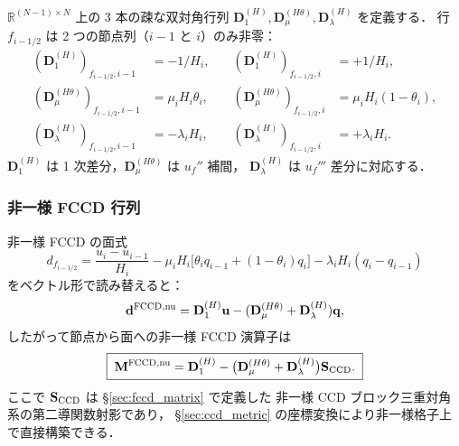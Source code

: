 $\mathbb{R}^{(N-1)\times N}$ 上の
3 本の疎な双対角行列 $\mathbf{D}_1^{(H)}, \mathbf{D}_\mu^{(H\theta)}, \mathbf{D}_\lambda^{(H)}$ を定義する．
行 $f_{i-1/2}$ は 2 つの節点列（$i-1$ と $i$）のみ非零：
\begin{align}
  (\mathbf{D}_1^{(H)})_{f_{i-1/2},i-1} &= -1/H_i,
  &\quad (\mathbf{D}_1^{(H)})_{f_{i-1/2},i} &= +1/H_i, \label{eq:fccd_nu_D1}\\
  (\mathbf{D}_\mu^{(H\theta)})_{f_{i-1/2},i-1} &= \mu_i H_i\theta_i,
  &\quad (\mathbf{D}_\mu^{(H\theta)})_{f_{i-1/2},i} &= \mu_i H_i(1-\theta_i), \label{eq:fccd_nu_Dmu}\\
  (\mathbf{D}_\lambda^{(H)})_{f_{i-1/2},i-1} &= -\lambda_i H_i,
  &\quad (\mathbf{D}_\lambda^{(H)})_{f_{i-1/2},i} &= +\lambda_i H_i. \label{eq:fccd_nu_Dlambda}
\end{align}
$\mathbf{D}_1^{(H)}$ は 1 次差分，$\mathbf{D}_\mu^{(H\theta)}$ は $u_f''$ 補間，
$\mathbf{D}_\lambda^{(H)}$ は $u_f'''$ 差分に対応する．

\subsubsection{非一様 FCCD 行列}
\label{sec:fccd_nu_matrix_form}

非一様 FCCD の面式
\begin{equation}
  d_{f_{i-1/2}} = \frac{u_i - u_{i-1}}{H_i}
    - \mu_i H_i\bigl[\theta_i q_{i-1} + (1-\theta_i)q_i\bigr]
    - \lambda_i H_i(q_i - q_{i-1})
  \label{eq:fccd_nu_face_formula}
\end{equation}
をベクトル形で読み替えると：
\begin{equation}
  \mathbf{d}^{\mathrm{FCCD},\text{nu}}
  = \mathbf{D}_1^{(H)}\mathbf{u}
   - (\mathbf{D}_\mu^{(H\theta)} + \mathbf{D}_\lambda^{(H)})\mathbf{q},
\end{equation}
したがって節点から面への非一様 FCCD 演算子は
\begin{equation}
  \boxed{\;
  \mathbf{M}^{\mathrm{FCCD},\text{nu}}
  = \mathbf{D}_1^{(H)}
    - \bigl(\mathbf{D}_\mu^{(H\theta)} + \mathbf{D}_\lambda^{(H)}\bigr)
      \mathbf{S}_{\mathrm{CCD}}.
  \;}
  \label{eq:fccd_nu_composite_matrix}
\end{equation}
ここで $\mathbf{S}_{\mathrm{CCD}}$ は \S\ref{sec:fccd_matrix} で定義した
非一様 CCD ブロック三重対角系の第二導関数射影であり，
\S\ref{sec:ccd_metric} の座標変換により非一様格子上で直接構築できる．

